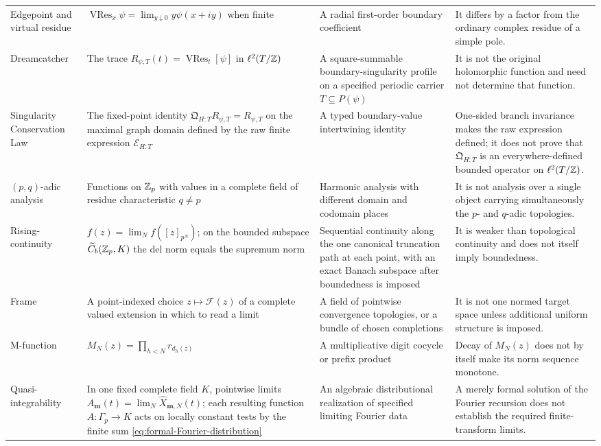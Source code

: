 \begin{longtable}{@{}p{}p{}p{}p{}@{}}
Edgepoint and virtual residue &
$\operatorname{VRes}_x\psi=\lim_{y\downarrow0}y\psi(x+iy)$ when finite & A
radial first-order boundary coefficient & It differs by a factor from the
ordinary complex residue of a simple pole.\\

Dreamcatcher & The trace
$R_{\psi,T}(t)=\operatorname{VRes}_t[\psi]$ in $\ell^2(T/\mathbb Z)$ & A
square-summable boundary-singularity profile on a specified periodic carrier
$T\subseteq P(\psi)$ & It is not the original holomorphic function and need
not determine that function.\\

Singularity Conservation Law & The fixed-point identity
$\mathfrak Q_{H:T}R_{\psi,T}=R_{\psi,T}$ on the maximal graph domain defined
by the raw finite expression $\mathcal E_{H:T}$ & A typed boundary-value
intertwining identity & One-sided branch invariance makes the raw expression
defined; it does not prove that $\mathfrak Q_{H:T}$ is an everywhere-defined
bounded operator on $\ell^2(T/\mathbb Z)$.\\

$(p,q)$-adic analysis & Functions on $\mathbb Z_p$ with values in a complete field
of residue characteristic $q\ne p$ & Harmonic analysis with different
domain and codomain places & It is not analysis over a single object carrying
simultaneously the $p$- and $q$-adic topologies.\\

Rising-continuity &
$f(z)=\lim_N f([z]_{p^N})$; on the bounded subspace
$\widetilde C_b(\mathbb Z_p,K)$ the del norm equals the supremum norm & Sequential
continuity along the one canonical truncation path at each point, with an
exact Banach subspace after boundedness is imposed & It is weaker than
topological continuity and does not itself imply boundedness.\\

Frame & A point-indexed choice $z\mapsto\mathcal F(z)$ of a complete valued
extension in which to read a limit & A field of pointwise convergence
topologies, or a bundle of chosen completions & It is not one normed target
space unless additional uniform structure is imposed.\\

M-function &
$M_N(z)=\prod_{h<N}r_{d_h(z)}$ & A multiplicative digit cocycle or prefix
product & Decay of $M_N(z)$ does not by itself make its norm sequence
monotone.\\

Quasi-integrability & In one fixed complete field $K$, pointwise limits
$A_{\mathbf m}(t)=\lim_N\widehat X_{\mathbf m,N}(t)$; each resulting function
$A:\Gamma_p\to K$ acts on locally constant tests by the finite sum
\cref{eq:formal-Fourier-distribution} & An algebraic distributional
realization of specified limiting Fourier data & A merely formal solution of
the Fourier recursion does not establish the required finite-transform
limits.\\


\end{longtable}
